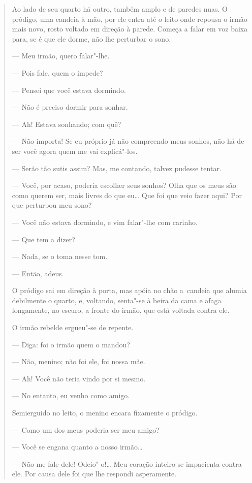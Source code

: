 \begin{quote}
Ao lado de seu quarto há outro, também amplo e de paredes nuas. O
pródigo, uma candeia à mão, por ele entra até o leito onde repousa o
irmão mais novo, rosto voltado em direção à parede. Começa a falar em
voz baixa para, se é que ele dorme, não lhe perturbar o sono.

--- Meu irmão, quero falar"-lhe.

--- Pois fale, quem o impede?

--- Pensei que você estava dormindo.

--- Não é preciso dormir para sonhar.

--- Ah! Estava sonhando; com quê?

--- Não importa! Se eu próprio já não compreendo meus sonhos, não há de
ser você agora quem me vai explicá"-los.

--- Serão tão sutis assim? Mas, me contando, talvez pudesse tentar.

--- Você, por acaso, poderia escolher seus sonhos? Olha que os meus são
como querem ser, mais livres do que eu\ldots{} Que foi que veio fazer aqui?
Por que perturbou meu sono?

--- Você não estava dormindo, e vim falar"-lhe com carinho.

--- Que tem a dizer?

--- Nada, se o toma nesse tom.

--- Então, adeus.

O pródigo sai em direção à porta, mas apóia no chão a~candeia que alumia
debilmente o quarto, e, voltando, senta"-se à beira da cama e afaga
longamente, no escuro, a fronte do irmão, que está voltada contra ele.

O irmão rebelde ergueu"-se de repente.

--- Diga: foi o irmão quem o mandou?

--- Não, menino; não foi ele, foi nossa mãe.

--- Ah! Você não teria vindo por si mesmo.

--- No entanto, eu venho como amigo.

Semierguido no leito, o menino encara fixamente o pródigo.

--- Como um dos meus poderia ser meu amigo?

--- Você se engana quanto a nosso irmão\ldots{}

--- Não me fale dele! Odeio"-o!\ldots{} Meu coração inteiro se impacienta
contra ele. Por causa dele foi que lhe respondi asperamente.


\end{quote}
